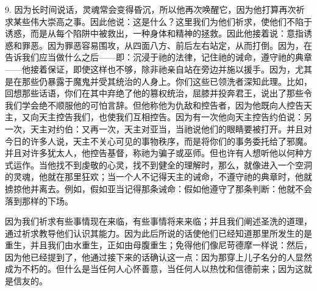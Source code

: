 9. 因为长时间说话，灵魂常会变得昏沉，所以他再次唤醒它，因为他打算再次祈求某些伟大崇高之事。因此他说：这是什么？这里我们为他们祈求，使他们不陷于诱惑，而是从每个陷阱中被救出，一种身体和精神的拯救。因此他接着说：意指诱惑和罪恶。因为罪恶容易围攻，从四面八方、前后左右站定，从而打倒。因为，在告诉我们应当做什么之后——即：沉浸于祂的法律，记住祂的诫命，遵守祂的典章——他接着保证，即使这样也不够，除非祂亲自站在旁边并施以援手。因为，尤其是在那些仍暴露于魔鬼并受其统治的人身上。你们这些已领洗者深知此理。比如，回想那些话语，你们在其中弃绝了他的篡权统治，屈膝并投奔君王，说出了那些令我们学会绝不顺服他的可怕言辞。但他称他为仇敌和控告者，因为他既向人控告天主，又向天主控告我们，也使我们互相控告。因为有一次他向天主控告约伯说：另一次，天主对约伯：又再一次，天主对亚当，当祂说他们的眼睛要被打开。并且对今日的许多人说，天主不关心可见的事物秩序，而是将你们的事务委托给了邪魔。并且对许多犹太人，他控告基督，称祂为骗子或巫师。但也许有人想听他以何种方式运作。当他找不到虔敬的心灵，找不到健全的理解时，那么，就像进入一个空洞的灵魂，他就在那里狂欢；当一个人不记得天主的诫命，不遵守祂的典章时，他就掳掠他并离去。例如，假如亚当记得那条诫命：假如他遵守了那条判断：他就不会落到那样的下场。\par

因为我们祈求有些事情现在来临，有些事情将来来临；并且我们阐述圣洗的道理，通过祈求教导他们认识其能力。因为此后所说的话使他们已经知道那里所发生的是重生，并且我们由水重生，正如由母腹重生；免得他们像尼苛德摩一样说：然后，因为他已经提到了，他通过接下来的话确认这一点：因为那穿上儿子名分的人显然成为不朽的。但什么是当任何人心怀善意，当任何人以热忱和信德前来；因为这就是信友的。\par

